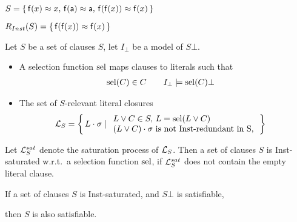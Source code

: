 \begin{example}
    \( S =
        \{\,
        \mathsf{f}(x)\approx x,\,
        \mathsf{f}(\mathsf{a})\approx \mathsf{a},\,
        \mathsf{f}(\mathsf{f}(x))\approx\mathsf{f}(x)
        \,\} \)

    \(R_{Inst}(S) = \{\, \mathsf{f}(\mathsf{f}(x))\approx\mathsf{f}(x) \,\}\)
    \end{example}

    \begin{definition}[S-Relevance]
        Let \(S\) be a set of clauses \(S\), let \(I_\bot\) be a model of \(S\bot\).

        \begin{itemize}
            \item
        A selection function \(\operatorname{sel}\) maps clauses to literals such that
        \begin{align*}
            \operatorname{sel}(C)&\in C
            &&&
            I_\bot&\models\operatorname{sel}(C)\bot
        \end{align*}

        \item
        The set of \(S\)-relevant literal closures
        \begin{align*}
            \mathcal{L}_S &= \left\{\, L\cdot\sigma \mid
            \begin{array}{l}
                L\lor C\in S,\,L = \operatorname{sel}(L\lor C)\\
                (L\lor C)\cdot\sigma\text{ is not Inst-redundant in S},\\
            \end{array}
            \,\right\}
        \end{align*}




    \end{itemize}
\end{definition}

\begin{definition}
    Let \(\mathcal{L}_S^{sat}\) denote the saturation process of \(\mathcal{L}_S\).
    Then a set of clauses \(S\) is Inst-saturated w.r.t.~a selection function \(\operatorname{sel}\),
            if \(\mathcal{L}_S^{sat}\) does not contain the empty literal clause.
\end{definition}
        \begin{theorem}
        If a set of clauses \(S\) is Inst-saturated,
        and \(S\bot\) is satisfiable,

        then \(S\) is also satisfiable.
        \end{theorem}


